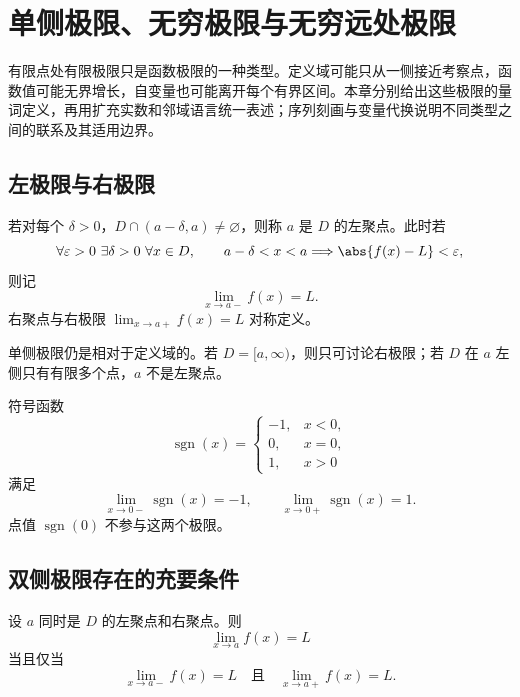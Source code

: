 \chapter{单侧极限、无穷极限与无穷远处极限}
\label{chap:generalized-function-limits}

\begin{chapterguide}
有限点处有限极限只是函数极限的一种类型。定义域可能只从一侧接近考察点，函数值可能无界增长，自变量也可能离开每个有界区间。本章分别给出这些极限的量词定义，再用扩充实数和邻域语言统一表述；序列刻画与变量代换说明不同类型之间的联系及其适用边界。
\end{chapterguide}

\section{左极限与右极限}

\begin{definition}[单侧聚点与单侧极限]
若对每个 \(\delta>0\)，\(D\cap(a-\delta,a)\ne\varnothing\)，则称 \(a\) 是 \(D\) 的左聚点。此时若
\[
 \forall\varepsilon>0\ \exists\delta>0\ \forall x\in D,\qquad
 a-\delta<x<a\Longrightarrow\abs{f(x)-L}<\varepsilon,
\]
则记
\[
 \lim_{x\to a-}f(x)=L.
\]
右聚点与右极限 \(\lim_{x\to a+}f(x)=L\) 对称定义。
\end{definition}

单侧极限仍是相对于定义域的。若 \(D=[a,\infty)\)，则只可讨论右极限；若 \(D\) 在 \(a\) 左侧只有有限多个点，\(a\) 不是左聚点。

\begin{example}
符号函数
\[
 \operatorname{sgn}(x)=
 \begin{cases}
 -1,&x<0,\\
 0,&x=0,\\
 1,&x>0
 \end{cases}
\]
满足
\[
 \lim_{x\to0-}\operatorname{sgn}(x)=-1,\qquad
 \lim_{x\to0+}\operatorname{sgn}(x)=1.
\]
点值 \(\operatorname{sgn}(0)\) 不参与这两个极限。
\end{example}

\section{双侧极限存在的充要条件}

\begin{theorem}[双侧与单侧极限]
设 \(a\) 同时是 \(D\) 的左聚点和右聚点。则
\[
 \lim_{x\to a}f(x)=L
\]
当且仅当
\[
 \lim_{x\to a-}f(x)=L
 \quad\text{且}\quad
 \lim_{x\to a+}f(x)=L.
\]
\end{theorem}

